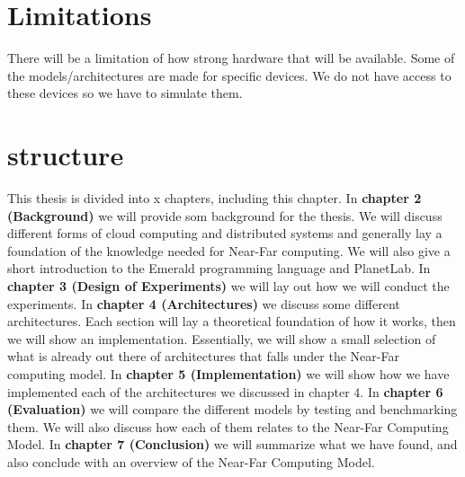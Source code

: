 \section{Limitations}
There will be a limitation of how strong hardware that will be available. Some of the models/architectures are made for specific devices. We do not have access to these devices so we have to simulate them.


\section{structure}
This thesis is divided into x chapters, including this chapter. 
In \textbf{chapter 2 (Background)} we will provide som background for the thesis. We will discuss different forms of cloud computing and distributed systems and generally lay a foundation of the knowledge needed for Near-Far computing. We will also give a short introduction to the Emerald programming language and PlanetLab.
In \textbf{chapter 3 (Design of Experiments)} we will lay out how we will conduct the experiments.
In \textbf{chapter 4 (Architectures)} we discuss some different architectures. Each section will lay a theoretical foundation of how it works, then we will show an implementation. Essentially, we will show a small selection of what is already out there of architectures that falls under the Near-Far computing model.
In \textbf{chapter 5 (Implementation)} we will show how we have implemented each of the architectures we discussed in chapter 4. 
In \textbf{chapter 6 (Evaluation)} we will compare the different models by testing and benchmarking them. We will also discuss how each of them relates to the Near-Far Computing Model.
In \textbf{chapter 7 (Conclusion)} we will summarize what we have found, and also conclude with an overview of the Near-Far Computing Model.

